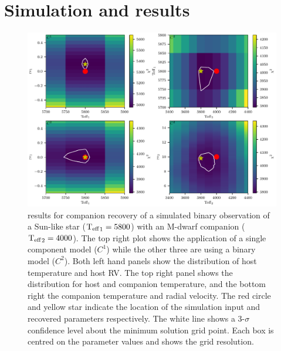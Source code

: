 
\section{Simulation and results}
\label{sec:chi2_results}



\begin{figure}
    \centering
    \includegraphics[width=0.8\linewidth]{figures/companion_recovery/Mdwarf_pcolors}
    \caption[\textchisquared{} contour for companion recovery of a simulated Sun - M-dwarf binary.]{\textchisquared{} results for companion recovery of a simulated binary observation of a Sun-like star (\({\textrm{T}_{\mathrm{eff}}}_{1}=5800\)\K{}) with an M-dwarf companion (\({\textrm{T}_{\mathrm{eff}}}_{2}=4000\)\K{}).
        The top right plot shows the application of a single component model (\(C^1\)) while the other three are using a binary model (\(C^2\)).
        Both left hand panels show the distribution of host temperature and host {RV}.
        The top right panel shows the distribution for host and companion temperature, and the bottom right the companion temperature and radial velocity.
        The red circle and yellow star indicate the location of the simulation input and recovered parameters respectively.
        The white line shows a 3-\(\sigma\) confidence level about the minimum \textchisquared{} solution grid point.
        Each box is centred on the parameter values and shows the grid resolution.}
    \label{fig:Mdwarf_contours}
\end{figure}

